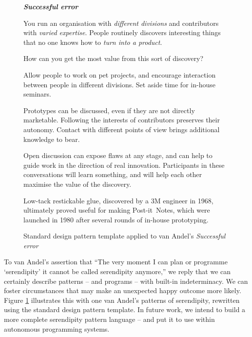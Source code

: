 \begin{figure}[!h]
{\normalsize
\begin{mdframed}
\vspace{2mm}
\textbf{\emph{Successful error}}~
\begin{description}[leftmargin=0\parindent,labelindent=0em,itemsep=2pt]
\item[{Context.}] You run an organisation with {\sl different
  divisions} and contributors with {\sl varied expertise}.  People routinely
  discovers interesting things that no one knows how to {\sl
    turn into a product}.
\item[{Problem.}]  How can you get the most value from this sort of discovery?
\item[{Solution.}] Allow people to work on pet projects, and encourage
  interaction between people in different divisions.  Set aside time
  for in-house seminars.
\item[{Rationale.}] Prototypes can be discussed, even if they are not
  directly marketable.  Following the interests of contributors
  preserves their autonomy.  Contact with different points of view
  brings additional knowledge to bear.
\item[{Resolution.}] 
Open discussion can
  expose flaws at any stage, and can help to guide work in the direction of
  real innovation.  Participants in these conversations
  will learn something, and will help each other maximise the value of
  the discovery.  
\item[{Example.}] Low-tack restickable glue, discovered by a 3M
  engineer in 1968, ultimately proved useful for making
  Post-it\texttrademark\ Notes, which were launched in 1980 after
  several rounds of in-house prototyping.
\end{description}
\vspace{-1mm}
\end{mdframed}
}
\caption{Standard design pattern template applied to van Andel's \em{Successful error}\label{fig:va-pattern-figure}}
\end{figure}

To van Andel's assertion that ``The
very moment I can plan or programme `serendipity' it cannot be called
serendipity anymore,'' we reply that we can certainly describe
patterns -- and programs -- with built-in indeterminacy.  We can
foster circumstances that may make an unexpected happy outcome more
likely.  Figure \ref{fig:va-pattern-figure} illustrates this with one
van Andel's patterns of serendipity, rewritten using the standard
design pattern template.  In future work, we intend to build a more
complete serendipity pattern language -- and put it to use within
autonomous programming systems.




